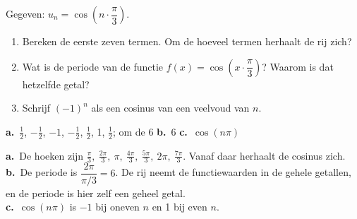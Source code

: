 \begin{oefeningen}
\begin{oefening}[2]
 Gegeven: $u_n = \cos\left(n \cdot \dfrac{\pi}{3}\right)$.
\begin{enumerate}
  \item Bereken de eerste zeven termen. Om de hoeveel termen herhaalt de rij zich?
  \item Wat is de periode van de functie $f(x) = \cos\left(x \cdot \dfrac{\pi}{3}\right)$? Waarom is dat hetzelfde getal?
  \item Schrijf $(-1)^n$ als een cosinus van een veelvoud van $n$.
\end{enumerate}
\begin{solution}
\textbf{a.}~$\tfrac12$, $-\tfrac12$, $-1$, $-\tfrac12$, $\tfrac12$, 1, $\tfrac12$; om de 6 \quad \textbf{b.}~6 \quad \textbf{c.}~$\cos(n\pi)$
\end{solution}
\begin{fullsolution}
\textbf{a.}~De hoeken zijn $\tfrac{\pi}{3},\ \tfrac{2\pi}{3},\ \pi,\ \tfrac{4\pi}{3},\ \tfrac{5\pi}{3},\ 2\pi,\ \tfrac{7\pi}{3}$. Vanaf daar herhaalt de cosinus zich.\\
\textbf{b.}~De periode is $\dfrac{2\pi}{\pi/3}=6$. De rij neemt de functiewaarden in de gehele getallen, en de periode is hier zelf een geheel getal.\\
\textbf{c.}~$\cos(n\pi)$ is $-1$ bij oneven $n$ en 1 bij even $n$.
\end{fullsolution}
\end{oefening}


\end{oefeningen}
